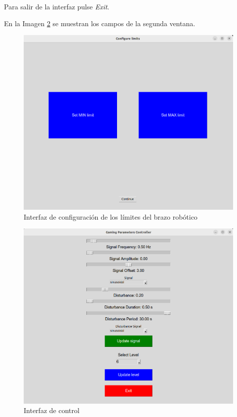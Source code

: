 Para salir de la interfaz pulse \textit{Exit}.

En la Imagen \ref{fig:control} se muestran los campos de la segunda ventana.

\begin{figure}[ht!]
	\centering
	\begin{minipage}{0.85\linewidth}
		\centering
		\includegraphics[width=\linewidth]{figs/config_limits.png}
	\end{minipage}
	\caption[Interfaz de configuración de los límites del brazo robótico]{Interfaz de configuración de los límites del brazo robótico}
	\label{fig:config}
\end{figure}

\begin{figure}[ht!]
	\centering
	\begin{minipage}{0.85\linewidth}
		\centering
		\includegraphics[width=\linewidth]{figs/control_pannel.png}
	\end{minipage}
	\caption[Interfaz de control]{Interfaz de control}
	\label{fig:control}
\end{figure}

